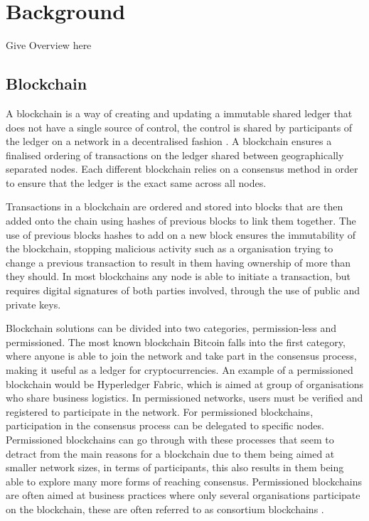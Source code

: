 \chapter{Background}\label{ch:background}

Give Overview here

\section{Blockchain}

A blockchain is a way of creating and updating a immutable shared ledger that does not have a single source of control, the control is shared by participants of the ledger on a network in a decentralised fashion \cite{Baliga2017UnderstandingBC}. A blockchain ensures a finalised ordering of transactions on the ledger shared between geographically separated nodes. Each different blockchain relies on a consensus method in order to ensure that the ledger is the exact same across all nodes. 

Transactions in a blockchain are ordered and stored into blocks that are then added onto the chain using hashes of previous blocks to link them together\cite{SCIOT}. The use of previous blocks hashes to add on a new block ensures the immutability of the blockchain, stopping malicious activity such as a organisation trying to change a previous transaction to result in them having ownership of more than they should. In most blockchains any node is able to initiate a transaction, but requires digital signatures of both parties involved, through the use of public and private keys. 

Blockchain solutions can be divided into two categories, permission-less and permissioned. The most known blockchain Bitcoin falls into the first category, where anyone is able to join the network and take part in the consensus process, making it useful as a ledger for cryptocurrencies. An example of a permissioned blockchain would be Hyperledger Fabric, which is aimed at group of organisations who share business logistics. In permissioned networks, users must be verified and registered to participate in the network. For permissioned blockchains, participation in the consensus process can be delegated to specific nodes. Permissioned blockchains can go through with these processes that seem to detract from the main reasons for a blockchain due to them being aimed at smaller network sizes, in terms of participants, this also results in them being able to explore many more forms of reaching consensus. Permissioned blockchains are often aimed at business practices where only several organisations participate on the blockchain, these are often referred to as consortium blockchains \cite{BCforIoT}.


